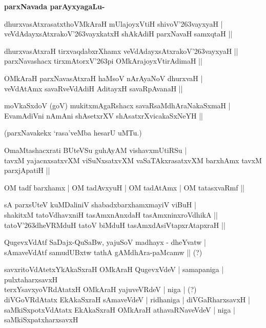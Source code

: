 {\bigskip
\noindent
{\large\bf parxNavada parAyxyagaLu-}}
\begin{itemize}
{\bf 
\item[1.] dhurxvasAtxrasatxthoVMkAraH mUlajoyxVtiH shivoV\char'263vayxyaH |\\\label{155c}
veVdAdayxsAtxrakoV\char'263vayxkatxH shAkAdiH parxNavaH samxqtaH ||
\item[2.] dhurxvasAtxraH tirxvaqdabxrXhamx veVdAdayxsAtxrakoV\char'263vayxyaH ||\\\label{155d}
parxNavashacx tirxmAtorxV\char'263pi OMkArajoyxVtirAdimaH ||
\item[3.] OMkAraH parxNavasAtxraH haMsoV nArAyaNoV dhurxvaH |\\\label{155e}
veVdAtAmx savaRveVdAdiH AditayxH savaRpAvanaH ||
\item[4.] moVkaSxdoV (goV) mukitxmAgaRshacx savaRsaMdhAraNakaSxmaH |\\
EvamAdiVni nAmAni shAsetxrXV shAsatxrXvicakaSxNeYH ||}
\end{itemize}
(parxNavakekx `rasa'veMba hesarU uMTu.)
\begin{itemize}
{\bf 
\item[5.] OmaMtashacxrati BUteVSu guhAyAM vishavxmUtiRSu |\\\label{156}
tavxM yajacnxsatxvXM viSuNxsatxvXM vaSaTAkxrasatxvXM barxhAmx tavxM parxjApatiH ||
\item[6.] OM tadf barxhamx | OM tadAvxyuH | OM tadAtAmx | OM tatasxvaRmf ||\label{156a}
\item[7.] sA parxsUteV kuMDaliniV shabadxbarxhamxmayiV viBuH |\label{156aa}\\
shakitxM tatoVdhavxniH tasAmxnAnxdaH tasAmxninxroVdhikA ||\\
tatoV\char'263dheVRMduH tatoV biMduH tasAmxdAsiVtapxrAtapxraH ||
\item[8.] QugevxVdAtf SaDajx-QuSaBw, yajuSoV madhayx - dheYvatw |\\\label{156b}
sAmaveVdAtf samudUBxtw tathA gAMdhAra-paMcamw || (?)
\item[9.] savxritoVdAtetxYkAkaSxraH\label{156c} OMkAraH QugevxVdeV | samapaniga | pulxtaharxsavxH \\
terxYsavxyoVRdAtatxH OMkAraH yajuveVRdeV | niga | (?)\\
diVGoVRdAtatx EkAkaSxraH sAmaveVdeV | ridhaniga | diVGaRharxsavxH |\\
saMkiSxpotxVdAtatx EkAkaSxraH OMkAraH athavaRNaveVdeV | niga |\\
saMkiSxpatxharxsavxH}
\end{itemize}

